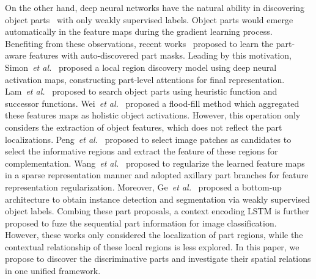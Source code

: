 \documentclass[journal]{IEEEtran}
\def\etal{{\em et al.}}
\begin{document}
On the other hand, deep neural networks have the natural ability in discovering object parts~\cite{gonzalez2018semantic} with only weakly supervised labels. Object parts would emerge automatically in the feature maps during the gradient learning process. Benefiting from these observations, recent works~\cite{xiao2015application,simon2015neural,lam2017fine,fu2017look,recasens2018learning,yang2018learning,ding2019selective,wang2020weakly} proposed to learn the part-aware features with auto-discovered part masks.
Leading by this motivation, Simon~\etal~\cite{simon2015neural} proposed a local region discovery model using deep neural activation maps, constructing part-level attentions for final representation. Lam~\etal~\cite{lam2017fine} proposed to search object parts using heuristic function and successor functions.
Wei~\etal~\cite{wei2017selective} proposed a flood-fill method which aggregated these features maps as holistic object activations.
However, this operation only considers the extraction of object features, which does not reflect the part localizations.
Peng~\etal~\cite{peng2017object} proposed to select image patches as candidates to select the informative regions and extract the feature of these regions for complementation. Wang~\etal~\cite{wang2020weakly} proposed to regularize the learned feature maps in a sparse representation manner and adopted axillary part branches for feature representation regularization.
Moreover, Ge~\etal~\cite{ge2019weakly} proposed a bottom-up architecture to obtain instance detection and segmentation via weakly supervised object labels. Combing these part proposals, a context encoding LSTM is further proposed to fuze the sequential part information for image classification.
However, these works only considered the localization of part regions, while the contextual relationship of these local regions is less explored. In this paper, we propose to discover the discriminative parts and investigate their spatial relations in one unified framework.
\end{document}
